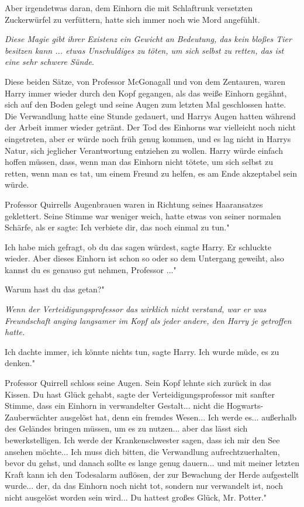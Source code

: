 Aber irgendetwas daran, dem Einhorn die mit Schlaftrunk versetzten Zuckerwürfel
zu verfüttern, hatte sich immer noch wie Mord angefühlt.

\emph{Diese Magie gibt ihrer Existenz ein Gewicht an Bedeutung, das kein bloßes Tier besitzen kann ... etwas Unschuldiges zu töten, um sich selbst zu retten, das ist eine sehr schwere Sünde.}

Diese beiden Sätze, von Professor McGonagall und von dem Zentauren, waren Harry
immer wieder durch den Kopf gegangen, als das weiße Einhorn gegähnt, sich auf
den Boden gelegt und seine Augen zum letzten Mal geschlossen hatte. Die
Verwandlung hatte eine Stunde gedauert, und Harrys Augen hatten während der
Arbeit immer wieder getränt. Der Tod des Einhorns war vielleicht noch nicht
eingetreten, aber er würde noch früh genug kommen, und es lag nicht in Harrys
Natur, sich jeglicher Verantwortung entziehen zu wollen. Harry würde einfach
hoffen müssen, dass, wenn man das Einhorn nicht tötete, um sich selbst zu
retten, wenn man es tat, um einem Freund zu helfen, es am Ende akzeptabel sein
würde.

Professor Quirrells Augenbrauen waren in Richtung seines Haaransatzes
geklettert. Seine Stimme war weniger weich, hatte etwas von seiner normalen
Schärfe, als er sagte: \glqq Ich verbiete dir, das noch einmal zu tun."

\glqq Ich habe mich gefragt, ob du das sagen würdest\grqq{}, sagte Harry. Er
schluckte wieder. \glqq Aber dieses Einhorn ist schon so oder so dem Untergang
geweiht, also kannst du es genauso gut nehmen, Professor ..."

\glqq Warum hast du das getan?"

\emph{Wenn der Verteidigungsprofessor das wirklich nicht verstand, war er was Freundschaft anging langsamer im Kopf als jeder andere, den Harry je getroffen hatte.}

\glqq Ich dachte immer, ich könnte nichts tun\grqq{}, sagte Harry. \glqq Ich
wurde müde, es zu denken."

Professor Quirrell schloss seine Augen. Sein Kopf lehnte sich zurück in das
Kissen. \glqq Du hast Glück gehabt\grqq{}, sagte der Verteidigungsprofessor mit
sanfter Stimme, \glqq dass ein Einhorn in verwandelter Gestalt... nicht die
Hogwarts-Zauberwächter ausgelöst hat, denn ein fremdes Wesen... Ich werde es...
außerhalb des Geländes bringen müssen, um es zu nutzen... aber das lässt sich
bewerkstelligen. Ich werde der Krankenschwester sagen, dass ich mir den See
ansehen möchte... Ich muss dich bitten, die Verwandlung aufrechtzuerhalten,
bevor du gehst, und danach sollte es lange genug dauern... und mit meiner
letzten Kraft kann ich den Todesalarm auflösen, der zur Bewachung der Herde
aufgestellt wurde... der, da das Einhorn noch nicht tot, sondern nur verwandelt
ist, noch nicht ausgelöst worden sein wird... Du hattest großes Glück, Mr.
Potter."

